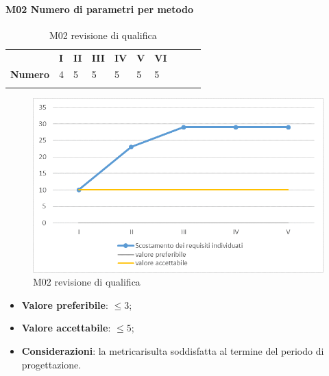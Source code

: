 \paragraph{M02 Numero di parametri per metodo} \mbox{}
\begin{longtable}[H!] {						
		>{}p{50mm}  		
		>{}p{8mm}
		>{}p{8mm}		
		>{}p{8mm}		
		>{}p{8mm}		
		>{}p{8mm}		
		>{}p{8mm}
		>{}p{8mm}
		>{}p{8mm}
		>{}p{8mm}
	}
	\rowcolor{gray!50}
	\textbf{} & \textbf{I} & \textbf{II} & \textbf{III} & \textbf{IV} & \textbf{V} & \textbf{VI} \TBstrut \\ [2mm]
	\textbf{Numero} & 4 & 5 & 5 & 5 & 5 & 5 \TBstrut \\ [2mm]
	\rowcolor{white}
	\caption{M02 revisione di qualifica}
\end{longtable}
\begin{figure}[H] 	
	\includegraphics[width=\linewidth]{./img/grafici/RP1.png}	
	\caption{M02 revisione di qualifica}	
\end{figure}
\begin{itemize}
	\item \textbf{Valore preferibile}: $\le 3$;
	\item \textbf{Valore accettabile}: $\le 5$;
	\item \textbf{Considerazioni}: la metrica\glosp risulta soddisfatta al termine del periodo di progettazione\glo.
\end{itemize}

